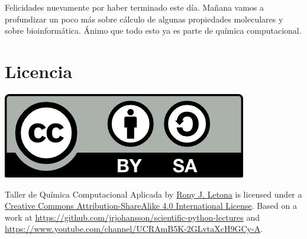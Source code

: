 \documentclass[10pt,letterpaper]{article}
\begin{document}
Felicidades nuevamente por haber terminado este d\'ia. Ma\~nana vamos a profundizar un poco m\'as sobre c\'alculo de algunas propiedades moleculares y sobre bioinform\'atica. \'Animo que todo esto ya es parte de qu\'imica computacional.

\section*{Licencia}

\noindent \includegraphics{img/cc_big.png}

\noindent Taller de Qu\'imica Computacional Aplicada by \href{http://github.com/zronyj/TQCA}{Rony J. Letona} is licensed under a \href{http://creativecommons.org/licenses/by-sa/4.0/}{Creative Commons Attribution-ShareAlike 4.0 International License}.
Based on a work at \url{https://github.com/jrjohansson/scientific-python-lectures} and \url{https://www.youtube.com/channel/UCRAmB5K-2GLvtaXcH9GCy-A}.
\end{document}
